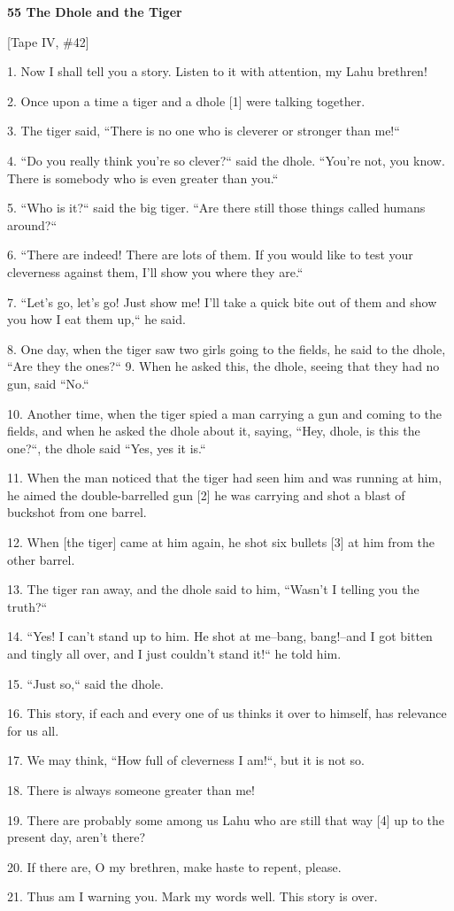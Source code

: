 
{\Large{}\textbf{55 The Dhole and the Tiger}}

{\Large{}[Tape IV, \#42]}

{\Large{}1. Now I shall tell you a story. Listen to it with attention, my Lahu
brethren!}

{\Large{}2. Once upon a time a tiger and a dhole [1] were talking together.}

{\Large{}3. The tiger said, ``There is no one who is cleverer or stronger
than me!``}

{\Large{}4. ``Do you really think you're so clever?`` said the
dhole. ``You're not, you know. There is somebody who is even greater than
you.`` }

{\Large{}5. ``Who is it?`` said the big tiger. ``Are there
still those things called humans around?`` }

{\Large{}6. ``There are indeed! There are lots of them. If you would like
to test your cleverness against them, I'll show you where they are.`` }

{\Large{}7. ``Let's go, let's go! Just show me! I'll take a quick bite
out of them and show you how I eat them up,`` he said.}

{\Large{}8. One day, when the tiger saw two girls going to the fields, he said
to the dhole, ``Are they the ones?`` 9. When he asked this, the
dhole, seeing that they had no gun, said ``No.``}

{\Large{}10. Another time, when the tiger spied a man carrying a gun and coming
to the fields, and when he asked the dhole about it, saying, ``Hey, dhole,
is this the one?``, the dhole said ``Yes, yes it is.``
}

{\Large{}11. When the man noticed that the tiger had seen him and was running at
him, he aimed the double-barrelled gun [2] he was carrying and shot a blast of
buckshot from one barrel. }

{\Large{}12. When [the tiger] came at him again, he shot six bullets [3] at him
from the other barrel. }

{\Large{}13. The tiger ran away, and the dhole said to him, ``Wasn't I
telling you the truth?`` }

{\Large{}14. ``Yes! I can't stand up to him. He shot at me--bang, bang!--and
I got bitten and tingly all over, and I just couldn't stand it!`` he told
him. }

{\Large{}15. ``Just so,`` said the dhole.}

{\Large{}16. This story, if each and every one of us thinks it over to himself,
has relevance for us all. }

{\Large{}17. We may think, ``How full of cleverness I am!``, but
it is not so. }

{\Large{}18. There is always someone greater than me! }

{\Large{}19. There are probably some among us Lahu who are still that way [4] up
to the present day, aren't there? }

{\Large{}20. If there are, O my brethren, make haste to repent, please. }

{\Large{}21. Thus am I warning you. Mark my words well. This story is over. }

